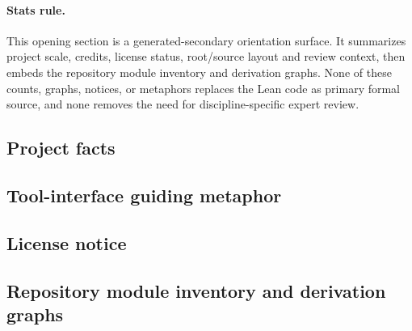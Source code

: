 \paragraph{Stats rule.} This opening section is a generated-secondary orientation surface. It summarizes project scale, credits, license status, root/source layout and review context, then embeds the repository module inventory and derivation graphs. None of these counts, graphs, notices, or metaphors replaces the Lean code as primary formal source, and none removes the need for discipline-specific expert review.
\subsection*{Project facts}

\subsection*{Tool-interface guiding metaphor}

\subsection*{License notice}

\subsection*{Repository module inventory and derivation graphs}

